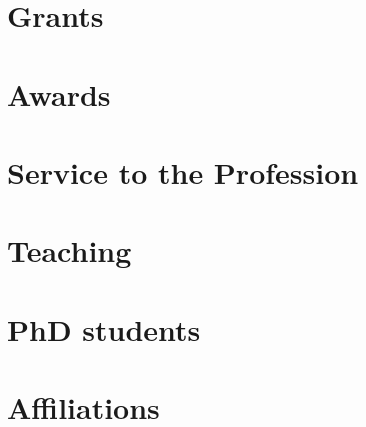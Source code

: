 \documentclass[11pt,a4paper]{article}
\begin{document}
\section*{Grants}%


\section*{Awards}%


\section*{Service to the Profession}%


\section*{Teaching}%


\section*{PhD students}%


\section*{Affiliations}%

\end{document}
